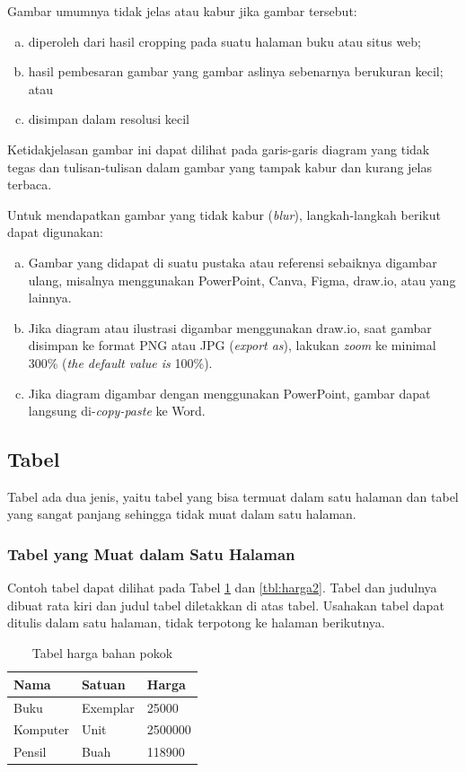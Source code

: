 Gambar umumnya tidak jelas atau kabur jika gambar tersebut:
\begin{enumerate}[a.]
  \item diperoleh dari hasil cropping pada suatu halaman buku atau situs web;
  \item hasil pembesaran gambar yang gambar aslinya sebenarnya berukuran kecil; atau
  \item disimpan dalam resolusi kecil
\end{enumerate}
Ketidakjelasan gambar ini dapat dilihat pada garis-garis diagram yang tidak tegas dan tulisan-tulisan dalam gambar yang tampak kabur dan kurang jelas terbaca.

Untuk mendapatkan gambar yang tidak kabur (\textit{blur}), langkah-langkah berikut dapat digunakan:
\begin{enumerate}[(a)]
\item Gambar yang didapat di suatu pustaka atau referensi sebaiknya digambar ulang, misalnya menggunakan PowerPoint, Canva, Figma, draw.io, atau yang lainnya.
\item Jika diagram atau ilustrasi digambar menggunakan draw.io, saat gambar disimpan ke format PNG atau JPG (\textit{export as}), lakukan \textit{zoom} ke minimal 300\% (\textit{the default value is} 100\%). 
\item Jika diagram digambar dengan menggunakan PowerPoint, gambar dapat langsung di-\textit{copy-paste} ke Word.
\end{enumerate}

\subsection{Tabel}
Tabel ada dua jenis, yaitu tabel yang bisa termuat dalam satu halaman dan tabel yang sangat panjang sehingga tidak muat dalam satu halaman.
\subsubsection{Tabel yang Muat dalam Satu Halaman}
Contoh tabel dapat dilihat pada Tabel \ref{tbl:harga1} dan \ref{tbl:harga2}. Tabel dan judulnya dibuat rata kiri dan judul tabel diletakkan di atas tabel. Usahakan tabel dapat ditulis dalam satu halaman, tidak terpotong ke halaman berikutnya.

\begin{table}[t] %
  \begin{tabular}{ | p{2cm} | p{2cm} | p{3cm} |}
	\hline
	Nama 	& Satuan 		& Harga \\
	\hline
	Buku 	& Exemplar	& 25000 \\
	Komputer	& Unit		& 2500000 \\
	Pensil	& Buah		& 118900 \\
	\hline
	\end{tabular}
\caption{Tabel harga bahan pokok}
\label{tbl:harga1}
\end{table}

